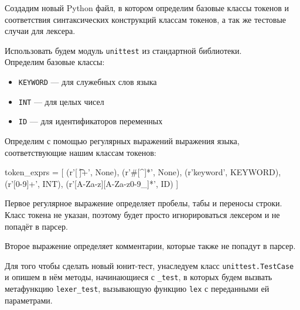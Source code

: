 \documentclass[a4paper,12pt]{article}
\begin{document}
\par Создадим новый Python файл, в котором определим базовые классы токенов и соответствия синтаксических конструкций классам токенов, а так же тестовые случаи для лексера. 
\par Использовать будем модуль \verb|unittest| из стандартной библиотеки.\\

Определим базовые классы:
\begin{itemize}
\item \verb|KEYWORD| --- для служебных слов языка
\item \verb|INT| --- для целых чисел
\item \verb|ID| --- для идентификаторов переменных\\
\end{itemize}

Определим с помощью регулярных выражений выражения языка, соответствующие нашим классам токенов:
\begin{python}
token_exprs = [
    (r'[ \t\n]+', None),
    (r'#[^\n]*', None),
    (r'keyword', KEYWORD),
    (r'[0-9]+', INT),
    (r'[A-Za-z][A-Za-z0-9_]*', ID)
]
\end{python}
\vspace{12pt}

\par Первое регулярное выражение определяет пробелы, табы и переносы строки. Класс токена не указан, поэтому будет просто игнорироваться лексером и не попадёт в парсер.
\par Второе выражение определяет комментарии, которые также не попадут в парсер.

\par Для того чтобы сделать новый юнит-тест, унаследуем класс \verb|unittest.TestCase| и опишем в нём методы, начинающиеся с \verb|_test|, в которых будем вызвать метафункцию \verb|lexer_test|, вызывающую функцию \verb|lex| с переданными ей параметрами.\\

\newpage
\end{document}
